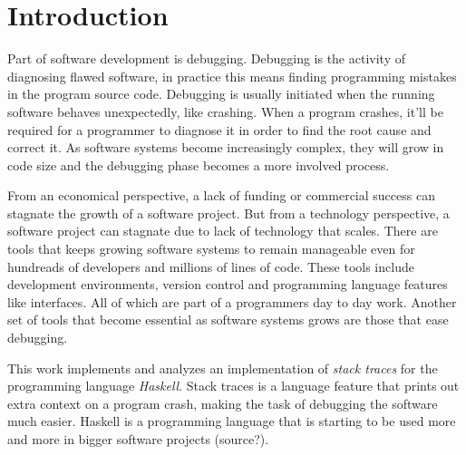 \chapter{Introduction}

Part of software development is debugging. Debugging is the activity of
diagnosing flawed software, in practice this means finding programming mistakes
in the program source code. Debugging is usually initiated when the running
software behaves unexpectedly, like crashing. When a program crashes, it'll be
required for a programmer to diagnose it in order to find the root cause and
correct it. As software systems become increasingly complex, they will grow in
code size and the debugging phase becomes a more involved process.

From an economical perspective, a lack of funding or commercial success can
stagnate the growth of a software project. But from a technology perspective, a
software project can stagnate due to lack of technology that scales. There are
tools that keeps growing software systems to remain manageable even for
hundreads of developers and millions of lines of code. These tools include
development environments, version control and programming language features
like interfaces. All of which are part of a programmers day to day work.
Another set of tools that become essential as software systems grows are those
that ease debugging.

This work implements and analyzes an implementation of \emph{stack traces} for
the programming language \emph{Haskell}. Stack traces is a language feature that
prints out extra context on a program crash, making the task of debugging the
software much easier. Haskell is a programming language that is starting to be
used more and more in bigger software projects (source?).


